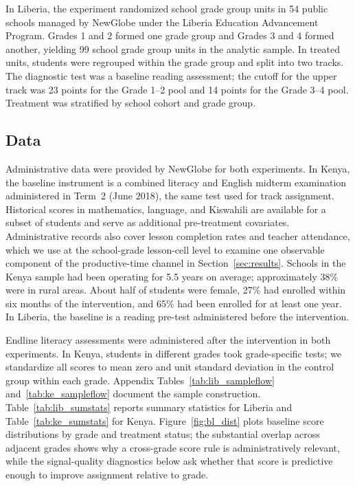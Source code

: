 \documentclass[11pt]{article}
\begin{document}
In Liberia, the experiment randomized school grade group units in 54 public schools managed by NewGlobe under the Liberia Education Advancement Program. Grades 1 and 2 formed one grade group and Grades 3 and 4 formed another, yielding 99 school grade group units in the analytic sample. In treated units, students were regrouped within the grade group and split into two tracks. The diagnostic test was a baseline reading assessment; the cutoff for the upper track was 23 points for the Grade 1--2 pool and 14 points for the Grade 3--4 pool. Treatment was stratified by school cohort and grade group.

\subsection{Data}

Administrative data were provided by NewGlobe for both experiments. In Kenya, the baseline instrument is a combined literacy and English midterm examination administered in Term~2 (June 2018), the same test used for track assignment. Historical scores in mathematics, language, and Kiswahili are available for a subset of students and serve as additional pre-treatment covariates. Administrative records also cover lesson completion rates and teacher attendance, which we use at the school-grade lesson-cell level to examine one observable component of the productive-time channel in Section~\ref{sec:results}. Schools in the Kenya sample had been operating for 5.5 years on average; approximately 38\% were in rural areas. About half of students were female, 27\% had enrolled within six months of the intervention, and 65\% had been enrolled for at least one year. In Liberia, the baseline is a reading pre-test administered before the intervention.

Endline literacy assessments were administered after the intervention in both experiments. In Kenya, students in different grades took grade-specific tests; we standardize all scores to mean zero and unit standard deviation in the control group within each grade. Appendix Tables~\ref{tab:lib_sampleflow} and~\ref{tab:ke_sampleflow} document the sample construction. Table~\ref{tab:lib_sumstats} reports summary statistics for Liberia and Table~\ref{tab:ke_sumstats} for Kenya. Figure~\ref{fig:bl_dist} plots baseline score distributions by grade and treatment status; the substantial overlap across adjacent grades shows why a cross-grade score rule is administratively relevant, while the signal-quality diagnostics below ask whether that score is predictive enough to improve assignment relative to grade.
\end{document}
